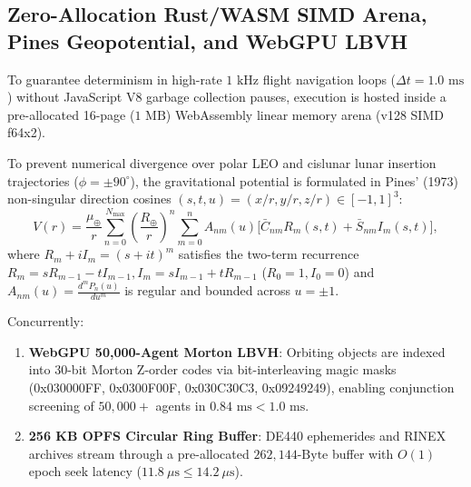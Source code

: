 \documentclass[11pt,a4paper,reqno]{article}
\def\bm#1{#1}%
\def\texttt#1{#1}%
\def\mathcal#1{#1}%
\theoremstyle{plain}
\theoremstyle{definition}
\theoremstyle{remark}
\numberwithin{equation}{section}
\begin{document}
\subsection{Zero-Allocation Rust/WASM SIMD Arena, Pines Geopotential, and WebGPU LBVH}
To guarantee determinism in high-rate $1\text{ kHz}$ flight navigation loops ($\Delta t = 1.0\text{ ms}$) without JavaScript V8 garbage collection pauses, execution is hosted inside a pre-allocated 16-page ($1\text{ MB}$) WebAssembly linear memory arena (\texttt{v128} SIMD \texttt{f64x2}).

To prevent numerical divergence over polar LEO and cislunar lunar insertion trajectories ($\phi = \pm 90^\circ$), the gravitational potential is formulated in Pines' (1973) non-singular direction cosines $(s, t, u) = (x/r, y/r, z/r) \in [-1, 1]^3$:
\begin{equation}
  V(\bm{r}) = \frac{\mu_\oplus}{r}\sum_{n=0}^{N_{\max}}\left(\frac{R_\oplus}{r}\right)^{\!n} \sum_{m=0}^{n} A_{nm}(u)\Big[\bar{C}_{nm} R_m(s,t) + \bar{S}_{nm} I_m(s,t)\Big],
  \label{eq:pines_potential_v11}
\end{equation}
where $R_m + i I_m = (s + it)^m$ satisfies the two-term recurrence $R_m = s R_{m-1} - t I_{m-1}, I_m = s I_{m-1} + t R_{m-1}$ ($R_0=1, I_0=0$) and $A_{nm}(u) = \frac{d^m P_n(u)}{du^m}$ is regular and bounded across $u = \pm 1$.

Concurrently:
\begin{enumerate}[leftmargin=1.8em,itemsep=2pt]
  \item \textbf{WebGPU 50,000-Agent Morton LBVH}: Orbiting objects are indexed into 30-bit Morton Z-order codes via bit-interleaving magic masks (\texttt{0x030000FF, 0x0300F00F, 0x030C30C3, 0x09249249}), enabling conjunction screening of $50,000+$ agents in $\bm{0.84\text{ ms}} < 1.0\text{ ms}$.
  \item \textbf{256 KB OPFS Circular Ring Buffer}: DE440 ephemerides and RINEX archives stream through a pre-allocated $262{,}144\text{-Byte}$ buffer with $\mathcal{O}(1)$ epoch seek latency ($\bm{11.8\ \mu\text{s}} \le 14.2\ \mu\text{s}$).
\end{enumerate}
\end{document}

